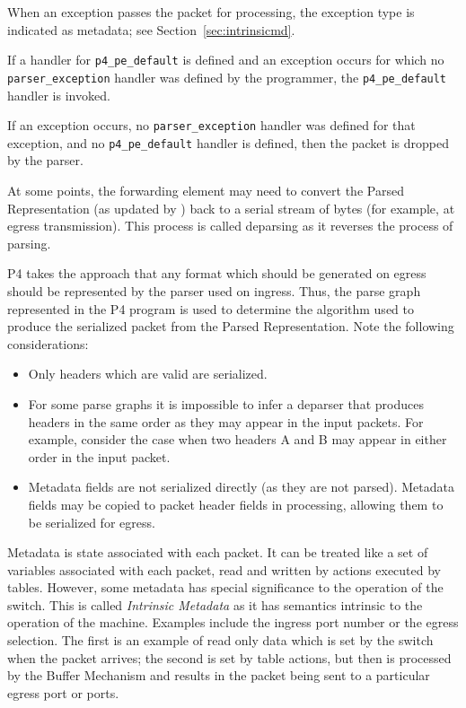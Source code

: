 \documentclass[12pt]{article}
\begin{document}
When an exception passes the packet for \matchaction processing, the exception 
type is indicated as metadata; see Section~\ref{sec:intrinsicmd}.


If a handler for \texttt{p4_pe_default} is defined and an exception occurs for which 
no \\
\texttt{parser_exception} handler was defined by the programmer, the \texttt{p4_pe_default} handler 
is invoked. 

If an exception occurs, no \texttt{parser_exception} handler was defined for that 
exception, and no \texttt{p4_pe_default} handler is defined, then the packet is 
dropped by the parser. 


At some points, the forwarding element may need to convert the Parsed 
Representation (as updated by \matchaction) back to a serial stream of bytes 
(for example, at egress transmission). This process is called deparsing as it 
reverses the process of parsing.

P4 takes the approach that any format which should be generated on egress 
should be represented by the parser used on ingress.  Thus, the parse graph 
represented in the P4 program is used to determine the algorithm used to produce 
the serialized packet from the Parsed Representation.  Note the following 
considerations:

\begin{itemize}
\item
Only headers which are valid are serialized.
\item
For some parse graphs it is impossible to infer a deparser that
produces headers in the same order as they may appear in the input
packets.  For example, consider the case when two headers A and B may
appear in either order in the input packet.
\item
Metadata fields are not serialized directly (as they are not parsed).  Metadata 
fields may be copied to packet header fields in \matchaction processing, allowing 
them to be serialized for egress.
\end{itemize}


Metadata is state associated with each packet. It can be treated like a set 
of variables associated with each packet, read and written by actions executed 
by tables. However, some metadata has special significance to the operation 
of the switch. This is called \textit{Intrinsic Metadata} as it has semantics intrinsic 
to the operation of the machine. Examples include the ingress port number 
or the egress selection. The first is an example of read only data which is 
set by the switch when the packet arrives; the second is set by table actions, 
but then is processed by the Buffer Mechanism and results in the packet being 
sent to a particular egress port or ports.
\end{document}
